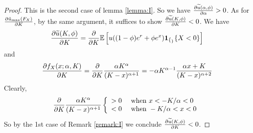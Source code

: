 \begin{subappendices}
\begin{proof}
  This is the second case of lemma \ref{lemma:I}. So we have
  ${\partial \widetilde u(\alpha, \phi) \over \partial \alpha} > 0$.
  As for ${\partial \tilde u_{\rm max}(F_X) \over \partial K}$, by the same
  argument, it suffices to show ${\partial \widetilde u(K, \phi) \over \partial K} < 0$.
  We have
  \[
  {\partial \widetilde u(K, \phi) \over \partial K}
  = {\partial \over \partial K} \mathbb{E} \left[
    u((1 - \phi) e^r + \phi e^x) \mathbf{1}_{\{_\}}{\{X < 0\}}
  \right] 
  \]
  and
  \begin{eqnarray*}
    {\partial f_X(x; \alpha, K) \over \partial K}
    = {\partial \over \partial K} {\alpha K^\alpha \over (K - x)^{\alpha + 1}}
   = -\alpha K^{\alpha - 1} {
      \alpha x + K
      \over
      (K - x)^{\alpha + 2}
    }
  \end{eqnarray*}
  Clearly,
  \[
  {\partial \over \partial K}
  {\alpha K^\alpha \over (K - x)^{\alpha + 1}}
  \left\{
    \begin{array}{ll}
      > 0 & \text{ when } x < -K/\alpha < 0\\
      < 0 & \text{ when } -K/\alpha < x < 0
    \end{array}
  \right.
  \]
  So by the 1st case of Remark \ref{remark:I} we conclude $  {\partial \widetilde u(K, \phi) \over \partial K} < 0$.
\end{proof}


\end{subappendices}

